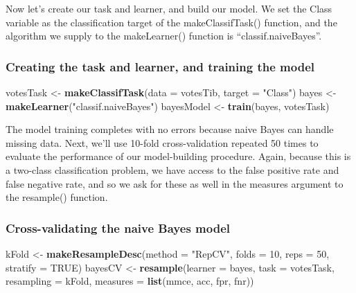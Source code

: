 \documentclass[
]{article}
\newenvironment{Shaded}{\begin{snugshade}}{\end{snugshade}}
\newcommand{\AttributeTok}[1]{\textcolor[rgb]{0.13,0.29,0.53}{#1}}
\newcommand{\ConstantTok}[1]{\textcolor[rgb]{0.56,0.35,0.01}{#1}}
\newcommand{\DecValTok}[1]{\textcolor[rgb]{0.00,0.00,0.81}{#1}}
\newcommand{\FunctionTok}[1]{\textcolor[rgb]{0.13,0.29,0.53}{\textbf{#1}}}
\newcommand{\NormalTok}[1]{#1}
\newcommand{\OtherTok}[1]{\textcolor[rgb]{0.56,0.35,0.01}{#1}}
\newcommand{\StringTok}[1]{\textcolor[rgb]{0.31,0.60,0.02}{#1}}
\begin{document}
Now let's create our task and learner, and build our model. We set the
Class variable as the classification target of the makeClassifTask()
function, and the algorithm we supply to the makeLearner() function is
``classif.naiveBayes''.

\subsubsection{Creating the task and learner, and training the
model}\label{creating-the-task-and-learner-and-training-the-model-1}

\begin{Shaded}
\begin{Highlighting}[]
\NormalTok{votesTask }\OtherTok{\textless{}{-}} \FunctionTok{makeClassifTask}\NormalTok{(}\AttributeTok{data =}\NormalTok{ votesTib, }\AttributeTok{target =} \StringTok{"Class"}\NormalTok{)}
\NormalTok{bayes }\OtherTok{\textless{}{-}} \FunctionTok{makeLearner}\NormalTok{(}\StringTok{"classif.naiveBayes"}\NormalTok{)}
\NormalTok{bayesModel }\OtherTok{\textless{}{-}} \FunctionTok{train}\NormalTok{(bayes, votesTask)}
\end{Highlighting}
\end{Shaded}

The model training completes with no errors because naive Bayes can
handle missing data. Next, we'll use 10-fold cross-validation repeated
50 times to evaluate the performance of our model-building procedure.
Again, because this is a two-class classification problem, we have
access to the false positive rate and false negative rate, and so we ask
for these as well in the measures argument to the resample() function.

\subsubsection{Cross-validating the naive Bayes
model}\label{cross-validating-the-naive-bayes-model}

\begin{Shaded}
\begin{Highlighting}[]
\NormalTok{kFold }\OtherTok{\textless{}{-}} \FunctionTok{makeResampleDesc}\NormalTok{(}\AttributeTok{method =} \StringTok{"RepCV"}\NormalTok{, }\AttributeTok{folds =} \DecValTok{10}\NormalTok{, }\AttributeTok{reps =} \DecValTok{50}\NormalTok{,}
                          \AttributeTok{stratify =} \ConstantTok{TRUE}\NormalTok{)}
\NormalTok{bayesCV }\OtherTok{\textless{}{-}} \FunctionTok{resample}\NormalTok{(}\AttributeTok{learner =}\NormalTok{ bayes, }\AttributeTok{task =}\NormalTok{ votesTask,}
                    \AttributeTok{resampling =}\NormalTok{ kFold,}
                    \AttributeTok{measures =} \FunctionTok{list}\NormalTok{(mmce, acc, fpr, fnr))}
\end{Highlighting}
\end{Shaded}
\end{document}
